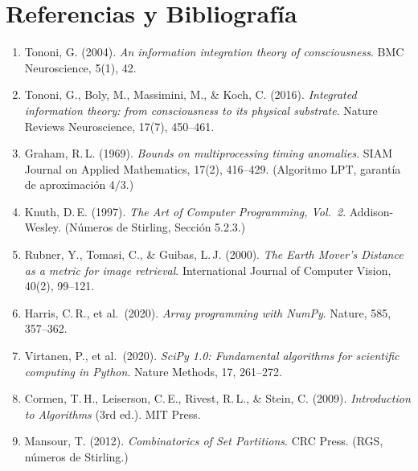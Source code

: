 \documentclass[12pt,letterpaper]{article}
\theoremstyle{definition}
\theoremstyle{remark}
\begin{document}
\section{Referencias y Bibliografía}
\label{apx:referencias}

\begin{enumerate}
  \item Tononi, G. (2004). \textit{An information integration theory of consciousness}.
    BMC Neuroscience, 5(1), 42.

  \item Tononi, G., Boly, M., Massimini, M., \& Koch, C. (2016).
    \textit{Integrated information theory: from consciousness to its physical substrate}.
    Nature Reviews Neuroscience, 17(7), 450--461.

  \item Graham, R.\,L. (1969). \textit{Bounds on multiprocessing timing anomalies}.
    SIAM Journal on Applied Mathematics, 17(2), 416--429.
    (Algoritmo LPT, garantía de aproximación $4/3$.)

  \item Knuth, D.\,E. (1997). \textit{The Art of Computer Programming, Vol.\ 2}.
    Addison-Wesley. (Números de Stirling, Sección 5.2.3.)

  \item Rubner, Y., Tomasi, C., \& Guibas, L.\,J. (2000).
    \textit{The Earth Mover's Distance as a metric for image retrieval}.
    International Journal of Computer Vision, 40(2), 99--121.

  \item Harris, C.\,R., et al.\ (2020). \textit{Array programming with NumPy}.
    Nature, 585, 357--362.

  \item Virtanen, P., et al.\ (2020).
    \textit{SciPy 1.0: Fundamental algorithms for scientific computing in Python}.
    Nature Methods, 17, 261--272.

  \item Cormen, T.\,H., Leiserson, C.\,E., Rivest, R.\,L., \& Stein, C. (2009).
    \textit{Introduction to Algorithms} (3rd ed.). MIT Press.

  \item Mansour, T. (2012). \textit{Combinatorics of Set Partitions}.
    CRC Press. (RGS, números de Stirling.)
\end{enumerate}

\newpage
\end{document}
